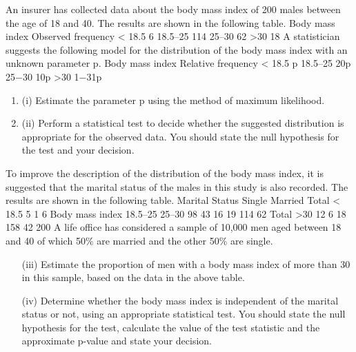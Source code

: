 \documentclass[a4paper,12pt]{article}
\begin{document}
An insurer has collected data about the body mass index of 200 males between the
age of 18 and 40. The results are shown in the following table.
Body mass index
Observed frequency
< 18.5
6
18.5–25
114
25–30
62
>30
18
A statistician suggests the following model for the distribution of the body mass index
with an unknown parameter p.
Body mass index
Relative frequency
< 18.5
p
18.5–25
20p
25−30
10p
>30
1−31p
\begin{enumerate}
\item (i) Estimate the parameter p using the method of maximum likelihood.
\item 
(ii) Perform a statistical test to decide whether the suggested distribution is appropriate for the observed data. You should state the null hypothesis for the test and your decision.
\end{enumerate}

To improve the description of the distribution of the body mass index, it is suggested that the marital status of the males in this study is also recorded. The results are
shown in the following table.
Marital Status
Single
Married
Total
< 18.5
5
1
6
Body mass index
18.5–25
25–30
98
43
16
19
114
62
Total
>30
12
6
18
158
42
200
A life office has considered a sample of 10,000 men aged between 18 and 40 of which 50\% are married and the other 50\% are single.
\begin{itemize}
\item[(iii)] Estimate the proportion of men with a body mass index of more than 30 in this sample, based on the data in the above table.

\item[(iv)] Determine whether the body mass index is independent of the marital status or not, using an appropriate statistical test. You should state the null hypothesis for the test, calculate the value of the test statistic and the approximate
p-value and state your decision.
\end{itemize}
\end{document}
